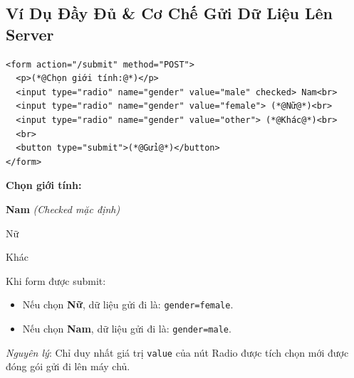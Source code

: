 \documentclass[11pt,oneside]{book}
\newcommand{\codeinline}[1]{\textcolor{accentOrange}{\texttt{#1}}}
\begin{document}
\subsection{Ví Dụ Đầy Đủ \& Cơ Chế Gửi Dữ Liệu Lên Server}

\begin{codeWindow}
\begin{lstlisting}[language=HTML5]
<form action="/submit" method="POST">
  <p>(*@Chọn giới tính:@*)</p>
  <input type="radio" name="gender" value="male" checked> Nam<br>
  <input type="radio" name="gender" value="female"> (*@Nữ@*)<br>
  <input type="radio" name="gender" value="other"> (*@Khác@*)<br>
  <br>
  <button type="submit">(*@Gửi@*)</button>
</form>
\end{lstlisting}
\end{codeWindow}

\begin{browserWindow}
\sffamily\small
\textbf{Chọn giới tính:} \\[6pt]
 \; \textbf{Nam} \quad \textcolor{codeComment}{\small\textit{(Checked mặc định)}} \\[4pt]
 \; Nữ \\[4pt]
 \; Khác \\[8pt]
\end{browserWindow}

\begin{tipBox}
Khi form được submit:
\begin{itemize}[leftmargin=1.5em, itemsep=2pt, parsep=0pt]
    \item Nếu chọn \textbf{Nữ}, dữ liệu gửi đi là: \codeinline{gender=female}.
    \item Nếu chọn \textbf{Nam}, dữ liệu gửi đi là: \codeinline{gender=male}.
\end{itemize}
\textit{Nguyên lý}: Chỉ duy nhất giá trị \codeinline{value} của nút Radio được tích chọn mới được đóng gói gửi đi lên máy chủ.
\end{tipBox}
\end{document}

